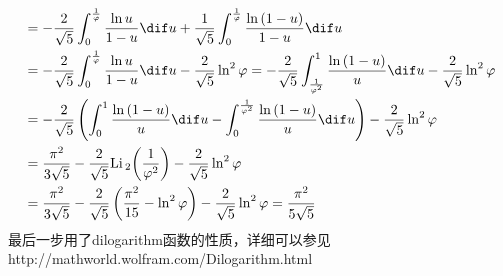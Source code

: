 \documentclass[color=green,titlestyle=hang]{elegantbook}%
\begin{document}
\begin{Solution}
\begin{align*}
&=-\frac{2}{\sqrt{5}}\int_{0}^{\frac{1}{\varphi}}{\frac{\ln{u}}{1-u}\dif u}+\frac{1}{\sqrt{5}}\int_{0}^{\frac{1}{\varphi}}{\frac{\ln{(1-u)}}{1-u}\dif u}\\ 
&=-\frac{2}{\sqrt{5}}\int_{0}^{\frac{1}{\varphi}}{\frac{\ln{u}}{1-u}\dif u}-\frac{2}{\sqrt{5}}\ln^{2}{\varphi}=-\frac{2}{\sqrt{5}}\int_{\frac{1}{\varphi^{2}}}^{1}{\frac{\ln{(1-u)}}{u}\dif u}-\frac{2}{\sqrt{5}}\ln^{2}{\varphi}\\ 
&=-\frac{2}{\sqrt{5}}\left(\int_{0}^{1}{\frac{\ln{(1-u)}}{u}\dif u}-\int_{0}^{\frac{1}{\varphi^{2}}}{\frac{\ln{(1-u)}}{u}\dif u} \right)-\frac{2}{\sqrt{5}}\ln^{2}{\varphi}\\ 
&=\frac{\pi^{2}}{3\sqrt{5}}-\frac{2}{\sqrt{5}}\mathrm{Li\,}_{2}{\left(\frac{1}{\varphi^{2}}\right)}-\frac{2}{\sqrt{5}}\ln^{2}{\varphi}\\
&=\frac{\pi^{2}}{3\sqrt{5}}-\frac{2}{\sqrt{5}}\left(\frac{\pi^{2}}{15}-\ln^{2}{\varphi} 
\right)-\frac{2}{\sqrt{5}}\ln^{2}{\varphi}=\frac{\pi^{2}}{5\sqrt{5}} 
\end{align*}
最后一步用了dilogarithm函数的性质，详细可以参见http://mathworld.wolfram.com/Dilogarithm.html	
\end{Solution}
\end{document}
